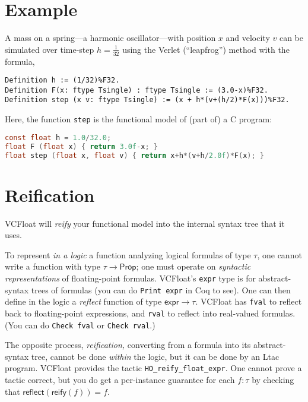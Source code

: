 \documentclass[article]{memoir}
\begin{document}
\chapter{Example}

A mass on a spring---a harmonic oscillator---with position $x$ and
velocity $v$ can be simulated over time-step $h=\frac{1}{32}$ using the
Verlet (``leapfrog'') method with the formula,

\begin{lstlisting}
Definition h := (1/32)%F32.
Definition F(x: ftype Tsingle) : ftype Tsingle := (3.0-x)%F32.  
Definition step (x v: ftype Tsingle) := (x + h*(v+(h/2)*F(x)))%F32.
\end{lstlisting}

Here, the function \lstinline{step} is the functional model of
(part of) a C program:

\begin{lstlisting}[language=C]
const float h = 1.0/32.0;
float F (float x) { return 3.0f-x; }
float step (float x, float v) { return x+h*(v+h/2.0f)*F(x); }
\end{lstlisting}

\chapter{Reification}

VCFloat will \emph{reify} your functional model into the internal
syntax tree that it uses.

To represent \emph{in a logic} a function analyzing logical formulas
of type $\tau$, one cannot write a function with type $\tau\rightarrow
\mathsf{Prop}$; one must operate on \emph{syntactic
representations} of floating-point formulas.
VCFloat's \lstinline{expr} type is for abstract-syntax trees of
formulas (you can do \lstinline{Print expr} in Coq to see).
One can then define in the logic a 
\emph{reflect} function of type $\mathsf{expr}\rightarrow \tau$.
VCFloat has \lstinline{fval} to reflect back to floating-point
expressions, and \lstinline{rval} to reflect into real-valued formulas.
(You can do \lstinline{Check fval} or \lstinline{Check rval}.)

The opposite process, \emph{reification,} converting
from a formula into its abstract-syntax tree, 
cannot be done \emph{within} the logic, but it can be done
by an Ltac program.  VCFloat provides
the tactic \lstinline{HO_reify_float_expr}.
One cannot prove a tactic correct, but
you do get a per-instance guarantee
for each $f:\tau$ by checking that $\mathsf{reflect}(\mathsf{reify}(f))=f$.
\end{document}
